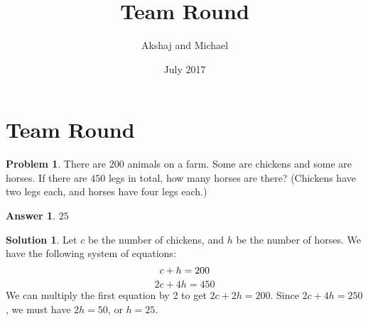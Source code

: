 \documentclass{article}
\title{Team Round}
\author{Akshaj and Michael}
\date{July 2017}
\begin{document}
\theoremstyle{definition}
\newtheorem{problems}{Problem}
\newtheorem*{answer}{Answer}
\newtheorem*{solution}{Solution}
\newtheorem*{stat}{Status}

\newenvironment{problem}[1]{\begin{problems}#1}{\end{problems}} 
\newenvironment{status}{\begin{stat}}{\newline  \end{stat}}

\begin{comment}
\def\answer{\comment}
\def\solution{\comment}
\end{comment}


\section{Team Round}

\begin{problem}
There are $200$ animals on a farm. Some are chickens and some are horses. If there are $450$ legs in total, how many horses are there?
(Chickens have two legs each, and horses have four legs each.)
\end{problem}
\begin{answer}
$25$
\end{answer}
\begin{solution}
Let $c$ be the number of chickens, and $h$ be the number of horses. We have the following system of equations:
\begin{equation}
c+h = 200 \\
\end{equation}
\begin{equation}
2c + 4h = 450
\end{equation}
We can multiply the first equation by 2 to get $2c + 2h = 200$. Since $2c + 4h = 250$, we must have $2h = 50$, or $h = \boxed{25}$.

\end{solution}
\end{document}
